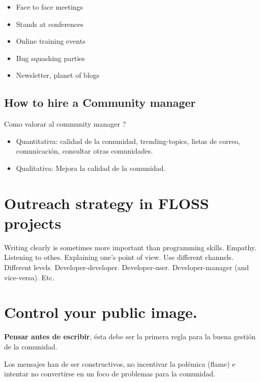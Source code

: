 \documentclass[11pt]{scrartcl}
\begin{document}
\begin{itemize}
	\item Face to face meetings
	\item Stands at conferences
	\item Online training events
	\item Bug squashing parties
	\item Newsletter, planet of blogs
\end{itemize}


\subsection{How to hire a Community manager}
\label{sub:}

Como valorar al community manager ?

\begin{itemize}
	\item Quantitativa: calidad de la comunidad, trending-topics, listas de correo, comunicación, consultar otras comunidades.
	\item Qualitativa: Mejora la calidad de la comunidad.
\end{itemize}


\section{Outreach strategy in FLOSS projects}
\label{sec:outreach}

Writing clearly is sometimes more important than programming skills.
    Empathy.
    Listening to othes.
    Explaining one’s point of view.
    Use different channels.
Different levels.
    Developer-developer.
    Developer-user.
    Developer-manager (and vice-versa).
    Etc.

\section{Control your public image.}
\label{sec:}

\par \textbf{Pensar antes de escribir}, ésta debe ser la primera regla para la buena gestión de la comunidad. 

\par Los mensajes han de ser constructivos, no incentivar la polémica (flame) e intentar no convertirse en un foco de problemas para la comunidad. 
\end{document}
